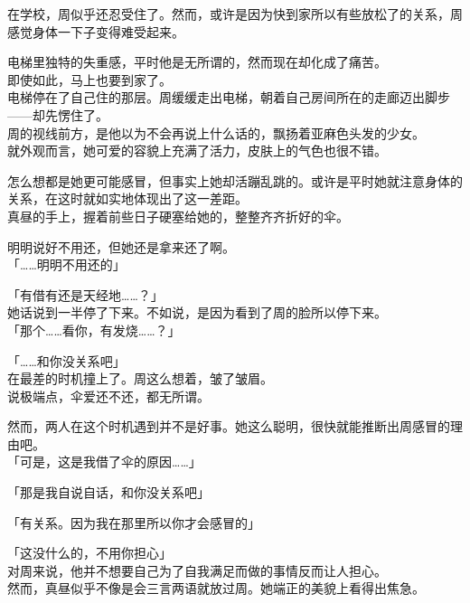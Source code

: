 在学校，周似乎还忍受住了。然而，或许是因为快到家所以有些放松了的关系，周感觉身体一下子变得难受起来。

电梯里独特的失重感，平时他是无所谓的，然而现在却化成了痛苦。\\

即使如此，马上也要到家了。\\

电梯停在了自己住的那层。周缓缓走出电梯，朝着自己房间所在的走廊迈出脚步——却先愣住了。\\

周的视线前方，是他以为不会再说上什么话的，飘扬着亚麻色头发的少女。\\

就外观而言，她可爱的容貌上充满了活力，皮肤上的气色也很不错。

怎么想都是她更可能感冒，但事实上她却活蹦乱跳的。或许是平时她就注意身体的关系，在这时就如实地体现出了这一差距。\\

真昼的手上，握着前些日子硬塞给她的，整整齐齐折好的伞。

明明说好不用还，但她还是拿来还了啊。\\

「……明明不用还的」

「有借有还是天经地……？」\\

她话说到一半停了下来。不如说，是因为看到了周的脸所以停下来。\\

「那个……看你，有发烧……？」

「……和你没关系吧」\\

在最差的时机撞上了。周这么想着，皱了皱眉。\\

说极端点，伞爱还不还，都无所谓。

然而，两人在这个时机遇到并不是好事。她这么聪明，很快就能推断出周感冒的理由吧。\\

「可是，这是我借了伞的原因……」

「那是我自说自话，和你没关系吧」

「有关系。因为我在那里所以你才会感冒的」

「这没什么的，不用你担心」\\

对周来说，他并不想要自己为了自我满足而做的事情反而让人担心。\\

然而，真昼似乎不像是会三言两语就放过周。她端正的美貌上看得出焦急。\\

